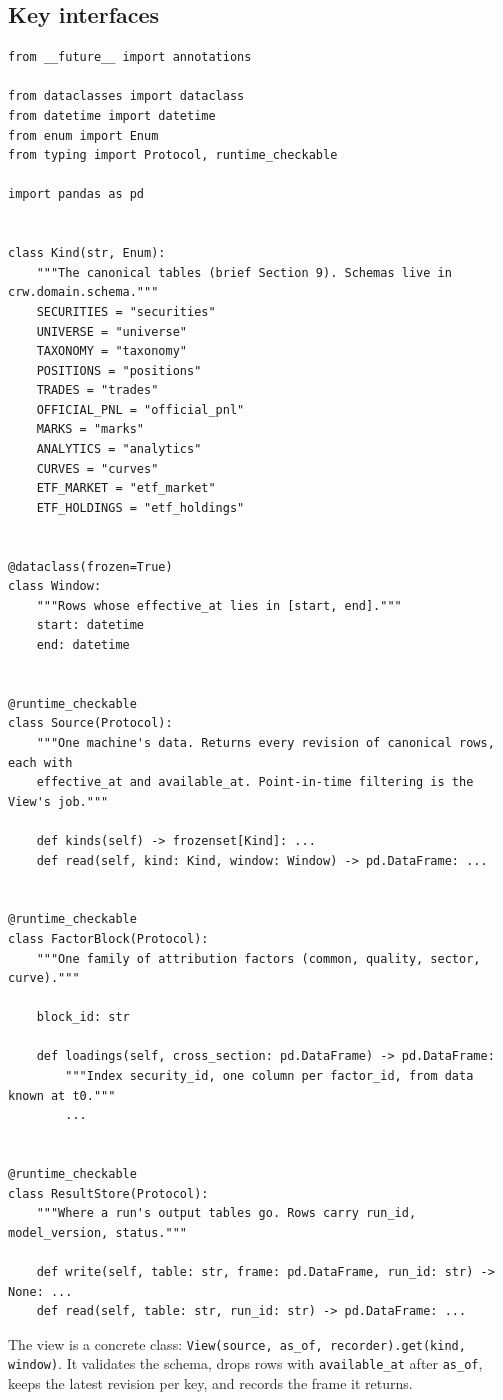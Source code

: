 \documentclass[11pt,a4paper]{article}
\newcommand{\code}[1]{\texttt{\small #1}}
\begin{document}
\subsection{Key interfaces}
\begin{lstlisting}
from __future__ import annotations

from dataclasses import dataclass
from datetime import datetime
from enum import Enum
from typing import Protocol, runtime_checkable

import pandas as pd


class Kind(str, Enum):
    """The canonical tables (brief Section 9). Schemas live in crw.domain.schema."""
    SECURITIES = "securities"
    UNIVERSE = "universe"
    TAXONOMY = "taxonomy"
    POSITIONS = "positions"
    TRADES = "trades"
    OFFICIAL_PNL = "official_pnl"
    MARKS = "marks"
    ANALYTICS = "analytics"
    CURVES = "curves"
    ETF_MARKET = "etf_market"
    ETF_HOLDINGS = "etf_holdings"


@dataclass(frozen=True)
class Window:
    """Rows whose effective_at lies in [start, end]."""
    start: datetime
    end: datetime


@runtime_checkable
class Source(Protocol):
    """One machine's data. Returns every revision of canonical rows, each with
    effective_at and available_at. Point-in-time filtering is the View's job."""

    def kinds(self) -> frozenset[Kind]: ...
    def read(self, kind: Kind, window: Window) -> pd.DataFrame: ...


@runtime_checkable
class FactorBlock(Protocol):
    """One family of attribution factors (common, quality, sector, curve)."""

    block_id: str

    def loadings(self, cross_section: pd.DataFrame) -> pd.DataFrame:
        """Index security_id, one column per factor_id, from data known at t0."""
        ...


@runtime_checkable
class ResultStore(Protocol):
    """Where a run's output tables go. Rows carry run_id, model_version, status."""

    def write(self, table: str, frame: pd.DataFrame, run_id: str) -> None: ...
    def read(self, table: str, run_id: str) -> pd.DataFrame: ...
\end{lstlisting}
The view is a concrete class: \code{View(source, as\_of, recorder).get(kind, window)}. It validates the schema, drops rows with \code{available\_at} after \code{as\_of}, keeps the latest revision per key, and records the frame it returns.
\end{document}

